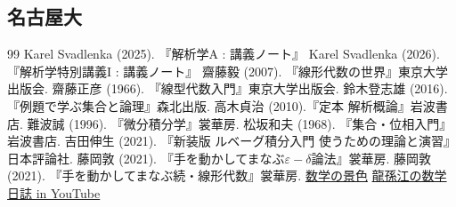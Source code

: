 \documentclass[titlepage]{jsarticle}
\numberwithin{equation}{section}
\begin{document}
\subsection{名古屋大}
\begin{thebibliography}{99}
Karel Svadlenka (2025). 『解析学A : 講義ノート』
Karel Svadlenka (2026). 『解析学特別講義I : 講義ノート』
齋藤毅 (2007). 『線形代数の世界』東京大学出版会.
齋藤正彦 (1966). 『線型代数入門』東京大学出版会.
鈴木登志雄 (2016). 『例題で学ぶ集合と論理』森北出版.
高木貞治 (2010).『定本 解析概論』岩波書店.
難波誠 (1996). 『微分積分学』裳華房.
松坂和夫 (1968). 『集合・位相入門』岩波書店.
吉田伸生 (2021). 『新装版 ルベーグ積分入門 使うための理論と演習』日本評論社.
藤岡敦 (2021). 『手を動かしてまなぶ$\varepsilon-\delta$論法』裳華房.
藤岡敦 (2021). 『手を動かしてまなぶ続・線形代数』裳華房.
\href{https://mathlandscape.com/}{数学の景色}
\href{https://www.youtube.com/@ron1827}{龍孫江の数学日誌 in YouTube} 
\end{thebibliography}
\end{document}
